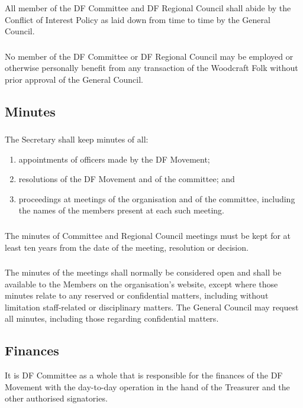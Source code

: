 \documentclass[a4paper, 12pt]{report}
\begin{document}
\subsubsection{}
All member of the DF Committee and DF Regional Council shall abide by the Conflict of Interest Policy as laid down from time to time by the General Council.
\subsubsection{}
No member of the DF Committee or DF Regional Council may be employed or otherwise personally benefit from any transaction of the Woodcraft Folk without prior approval of the General Council.

\subsection{Minutes}
\subsubsection{}
The Secretary shall keep minutes of all:
\begin{enumerate}[\hspace{0.5cm}(a)]
\item appointments of officers made by the DF Movement;
\item resolutions of the DF Movement and of the committee; and
\item proceedings at meetings of the organisation and of the committee, including the names of the members present at each such meeting.
\end{enumerate}
\subsubsection{}
The minutes of Committee and Regional Council meetings must be kept for at least ten years from the date of the meeting, resolution or decision.
\subsubsection{}
The minutes of the meetings shall normally be considered open and shall be available to the Members on the organisation's website, except where those minutes relate to any reserved or confidential matters, including without limitation staff-related or disciplinary matters. The General Council may request all minutes, including those regarding confidential matters.

\subsection{Finances}
It is DF Committee as a whole that is responsible for the finances of the DF Movement with
the day-to-day operation in the hand of the Treasurer and the other authorised signatories.
\end{document}
